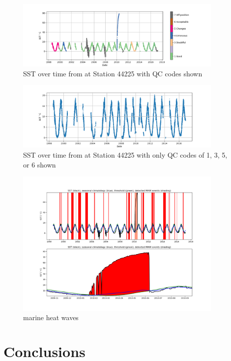 \documentclass[12pt, letterpaper]{article}
\begin{document}
\begin{figure}
\includegraphics[width=0.9\textwidth]{qc_sst_timeseries}
\caption{SST over time from at Station 44225 with QC codes shown}
\label{fig:qc_sst_timeseries}
\end{figure}

\begin{figure}
\includegraphics[width=0.9\textwidth]{filtered_sst_timeseries}
\caption{SST over time from at Station 44225 with only QC codes of 1, 3, 5, or 6 shown}
\label{fig:filterd_sst_timeseries}
\end{figure}

\begin{figure}
\includegraphics[width=0.9\textwidth]{plot}
\caption{marine heat waves}
\label{fig:mhws}
\end{figure}

\begin{figure}
\caption{}
\label{fig:distribution}
\end{figure}




\section{Conclusions}
\end{document}
